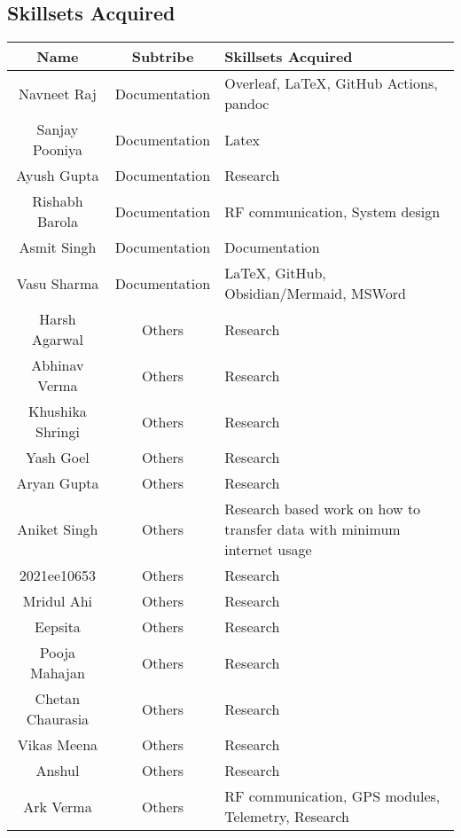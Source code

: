 \subsection{Skillsets Acquired}
\begin{center}
	\label{table:skillsets}
	\begin{longtable}{ | c | c | m{6cm} | }
		\hline
		\textbf{Name} & \textbf{Subtribe} & \textbf{Skillsets Acquired} \\
		\hline \hline
		Navneet Raj & Documentation & Overleaf, LaTeX, GitHub Actions, pandoc\\ 
        \hline 
        Sanjay Pooniya & Documentation & Latex\\ 
        \hline 
        Ayush Gupta & Documentation & Research\\ 
        \hline 
        Rishabh Barola & Documentation & RF communication, System design\\ 
        \hline 
        Asmit Singh & Documentation & Documentation\\ 
        \hline 
        Vasu Sharma & Documentation & LaTeX, GitHub, Obsidian/Mermaid, MSWord\\ 
        \hline 
        Harsh Agarwal & Others & Research\\ 
        \hline 
        Abhinav Verma & Others & Research\\ 
        \hline 
        Khushika Shringi & Others & Research\\ 
        \hline 
        Yash Goel & Others & Research\\ 
        \hline 
        Aryan Gupta & Others & Research\\ 
        \hline 
        Aniket Singh & Others & Research based work on how to transfer data with minimum internet usage\\ 
        \hline 
        2021ee10653 & Others & Research\\ 
        \hline 
        Mridul Ahi & Others & Research\\ 
        \hline 
        Eepsita & Others & Research\\ 
        \hline 
        Pooja Mahajan & Others & Research\\ 
        \hline 
        Chetan Chaurasia & Others & Research\\ 
        \hline 
        Vikas Meena & Others & Research\\ 
        \hline 
        Anshul & Others & Research\\ 
        \hline 
        Ark Verma & Others & RF communication, GPS modules, Telemetry, Research\\ 

\end{longtable}
\end{center}
